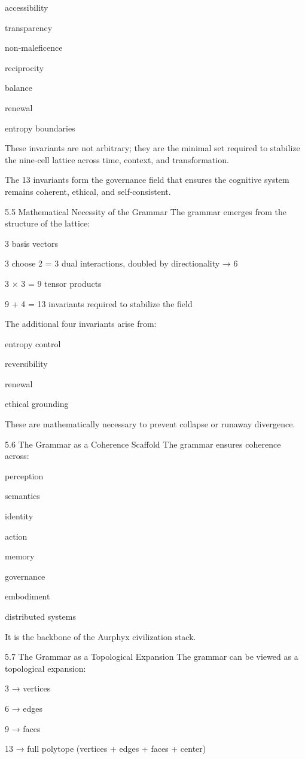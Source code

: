 accessibility

transparency

non‑maleficence

reciprocity

balance

renewal

entropy boundaries

These invariants are not arbitrary; they are the minimal set required to stabilize the nine‑cell lattice across time, context, and transformation.

The 13 invariants form the governance field that ensures the cognitive system remains coherent, ethical, and self‑consistent.

5.5 Mathematical Necessity of the Grammar The grammar emerges from the structure of the lattice:

3 basis vectors

3 choose 2 = 3 dual interactions, doubled by directionality → 6

3 × 3 = 9 tensor products

9 + 4 = 13 invariants required to stabilize the field

The additional four invariants arise from:

entropy control

reversibility

renewal

ethical grounding

These are mathematically necessary to prevent collapse or runaway divergence.

5.6 The Grammar as a Coherence Scaffold The grammar ensures coherence across:

perception

semantics

identity

action

memory

governance

embodiment

distributed systems

It is the backbone of the Aurphyx civilization stack.

5.7 The Grammar as a Topological Expansion The grammar can be viewed as a topological expansion:

3 → vertices

6 → edges

9 → faces

13 → full polytope (vertices + edges + faces + center)

